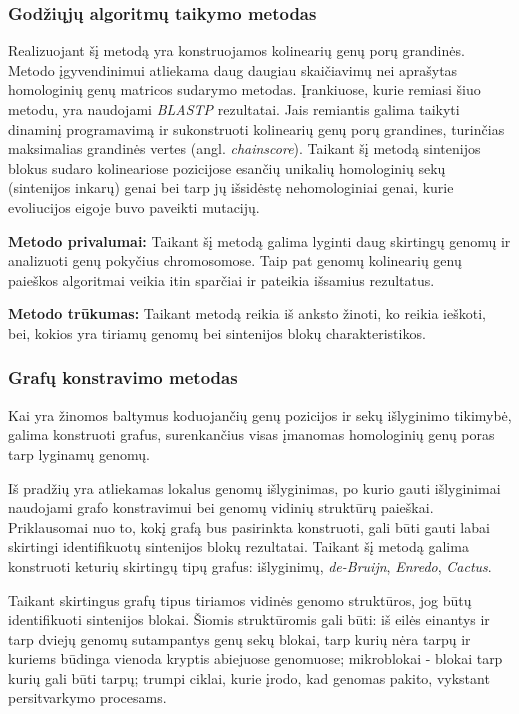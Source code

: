 \documentclass[12pt]{article}
\begin{document}
\subsubsection*{Godžiųjų algoritmų taikymo metodas}
Realizuojant šį metodą yra konstruojamos kolinearių genų porų grandinės. Metodo
įgyvendinimui atliekama daug daugiau skaičiavimų nei aprašytas homologinių genų
matricos sudarymo metodas.
Įrankiuose, kurie remiasi šiuo metodu, yra naudojami \emph{BLASTP} rezultatai.
Jais remiantis galima taikyti dinaminį programavimą ir sukonstruoti kolinearių
genų porų grandines, turinčias maksimalias grandinės vertes (angl. 
\emph{chainscore}). Taikant šį metodą sintenijos blokus sudaro kolineariose
pozicijose esančių unikalių homologinių sekų (sintenijos inkarų) genai bei tarp
jų išsidėstę nehomologiniai genai, kurie evoliucijos eigoje buvo paveikti
mutacijų.

\textbf{Metodo privalumai:} Taikant šį metodą galima lyginti daug skirtingų
genomų ir analizuoti genų pokyčius chromosomose. Taip pat genomų kolinearių
genų paieškos algoritmai veikia itin sparčiai ir pateikia išsamius rezultatus.

\textbf{Metodo trūkumas:} Taikant metodą reikia iš anksto žinoti, ko reikia
ieškoti, bei, kokios yra tiriamų genomų bei sintenijos blokų charakteristikos.

\subsubsection*{Grafų konstravimo metodas}
Kai yra žinomos baltymus koduojančių genų pozicijos ir sekų išlyginimo tikimybė,
galima konstruoti grafus, surenkančius visas įmanomas homologinių genų poras
tarp lyginamų genomų.

Iš pradžių yra atliekamas lokalus genomų išlyginimas, po kurio gauti išlyginimai
naudojami grafo konstravimui bei genomų vidinių struktūrų paieškai. Priklausomai
nuo to, kokį grafą bus pasirinkta konstruoti, gali būti gauti labai skirtingi
identifikuotų sintenijos blokų rezultatai. Taikant šį metodą galima konstruoti
keturių skirtingų tipų grafus: išlyginimų, \emph{de-Bruijn}, \emph{Enredo},
\emph{Cactus}.

Taikant skirtingus grafų tipus tiriamos vidinės genomo struktūros, jog būtų
identifikuoti sintenijos blokai. Šiomis struktūromis gali būti: iš eilės
einantys ir tarp dviejų genomų sutampantys genų sekų blokai, tarp kurių nėra
tarpų ir kuriems būdinga vienoda kryptis abiejuose genomuose; mikroblokai -
blokai tarp kurių gali būti tarpų; trumpi ciklai, kurie įrodo, kad genomas
pakito, vykstant persitvarkymo procesams.
\end{document}
